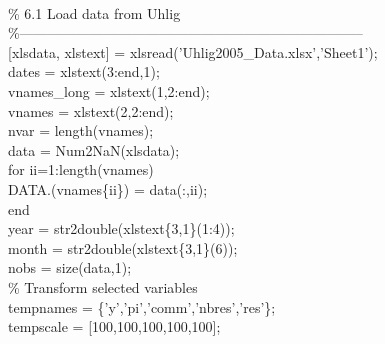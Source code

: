 \hspace{1mm} \\ 
\hspace{1mm}\textcolor{matlabgreen}{\% 6.1 Load data from Uhlig }\\ 
\hspace{1mm}\textcolor{matlabgreen}{\%--------------------------------------------------------------------------  }\\ 
\hspace{1mm}[xlsdata, xlstext] = xlsread(\textcolor{matlabpurple}{'Uhlig2005\_Data.xlsx'},\textcolor{matlabpurple}{'Sheet1'}); \\ 
\hspace{1mm}dates = xlstext(3:end,1); \\ 
\hspace{1mm}vnames\_long = xlstext(1,2:end); \\ 
\hspace{1mm}vnames = xlstext(2,2:end); \\ 
\hspace{1mm}nvar = length(vnames); \\ 
\hspace{1mm}data   = Num2NaN(xlsdata); \\ 
\hspace{1mm}\textcolor{matlabblue}{for} ii=1:length(vnames) \\ 
\hspace{1mm}\hspace{5mm} DATA.(vnames\{ii\}) = data(:,ii); \\ 
\hspace{1mm}\textcolor{matlabblue}{end} \\ 
\hspace{1mm}year = str2double(xlstext\{3,1\}(1:4)); \\ 
\hspace{1mm}month = str2double(xlstext\{3,1\}(6)); \\ 
\hspace{1mm}nobs = size(data,1); \\ 
\hspace{1mm}\textcolor{matlabgreen}{\% Transform selected variables }\\ 
\hspace{1mm}tempnames = \{\textcolor{matlabpurple}{'y'},\textcolor{matlabpurple}{'pi'},\textcolor{matlabpurple}{'comm'},\textcolor{matlabpurple}{'nbres'},\textcolor{matlabpurple}{'res'}\}; \\ 
\hspace{1mm}tempscale = [100,100,100,100,100]; \\ 
